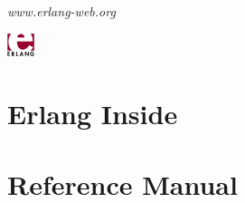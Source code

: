 \documentclass[12pt]{article}
\begin{document}
\maketitle

\begin{center}
{\it www.erlang-web.org}
\end{center}

\vfill

\begin{center}
\begin{abstract}
\begin{center}
Erlang Web 1.2 release tutorial. 
\end{center}
\end{abstract}

\includegraphics[width=30px]{images/erlang.jpg}
\end{center}
\newpage
\tableofcontents
\newpage

\clearpage
\section{Erlang Inside}


\clearpage


\clearpage


\clearpage


\clearpage


\clearpage


\clearpage


\clearpage
\section{Reference Manual}\label{refman}

\clearpage

\clearpage


%
%
%
%

\end{document}
